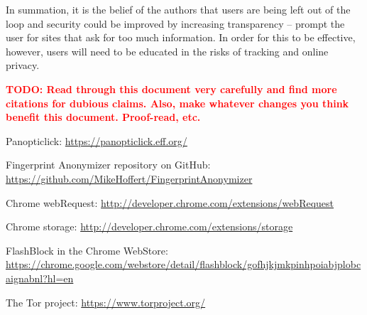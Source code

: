 \documentclass[12pt,a4paper]{article}
\begin{document}
In summation, it is the belief of the authors that users are being left out of the loop and security could be improved by increasing transparency -- prompt the user for sites that ask for too much information. In order for this to be effective, however, users will need to be educated in the risks of tracking and online privacy.

\textcolor{red}{\textbf{TODO: Read through this document very carefully and find more citations for dubious claims. Also, make whatever changes you think benefit this document. Proof-read, etc.}}

\begin{thebibliography}{0}

  Panopticlick: \url{https://panopticlick.eff.org/}

  Fingerprint Anonymizer repository on GitHub: \url{https://github.com/MikeHoffert/FingerprintAnonymizer}

  Chrome webRequest: \url{http://developer.chrome.com/extensions/webRequest}
  
  Chrome storage: \url{http://developer.chrome.com/extensions/storage}
  
  FlashBlock in the Chrome WebStore: \url{https://chrome.google.com/webstore/detail/flashblock/gofhjkjmkpinhpoiabjplobcaignabnl?hl=en}
  
  The Tor project: \url{https://www.torproject.org/}

\end{thebibliography}
\end{document}

